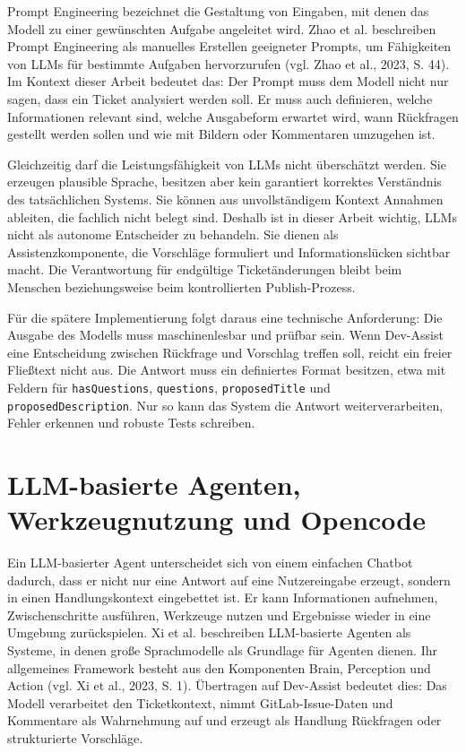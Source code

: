 \documentclass[12pt,a4paper,oneside]{scrreprt}
\begin{document}
Prompt Engineering bezeichnet die Gestaltung von Eingaben, mit denen das Modell zu einer gewünschten Aufgabe angeleitet wird. Zhao et al. beschreiben Prompt Engineering als manuelles Erstellen geeigneter Prompts, um Fähigkeiten von LLMs für bestimmte Aufgaben hervorzurufen (vgl. Zhao et al., 2023, S. 44). Im Kontext dieser Arbeit bedeutet das: Der Prompt muss dem Modell nicht nur sagen, dass ein Ticket analysiert werden soll. Er muss auch definieren, welche Informationen relevant sind, welche Ausgabeform erwartet wird, wann Rückfragen gestellt werden sollen und wie mit Bildern oder Kommentaren umzugehen ist.

Gleichzeitig darf die Leistungsfähigkeit von LLMs nicht überschätzt werden. Sie erzeugen plausible Sprache, besitzen aber kein garantiert korrektes Verständnis des tatsächlichen Systems. Sie können aus unvollständigem Kontext Annahmen ableiten, die fachlich nicht belegt sind. Deshalb ist in dieser Arbeit wichtig, LLMs nicht als autonome Entscheider zu behandeln. Sie dienen als Assistenzkomponente, die Vorschläge formuliert und Informationslücken sichtbar macht. Die Verantwortung für endgültige Ticketänderungen bleibt beim Menschen beziehungsweise beim kontrollierten Publish-Prozess.

Für die spätere Implementierung folgt daraus eine technische Anforderung: Die Ausgabe des Modells muss maschinenlesbar und prüfbar sein. Wenn Dev-Assist eine Entscheidung zwischen Rückfrage und Vorschlag treffen soll, reicht ein freier Fließtext nicht aus. Die Antwort muss ein definiertes Format besitzen, etwa mit Feldern für \texttt{hasQuestions}, \texttt{questions}, \texttt{proposedTitle} und \texttt{proposedDescription}. Nur so kann das System die Antwort weiterverarbeiten, Fehler erkennen und robuste Tests schreiben.

\section{LLM-basierte Agenten, Werkzeugnutzung und Opencode}

Ein LLM-basierter Agent unterscheidet sich von einem einfachen Chatbot dadurch, dass er nicht nur eine Antwort auf eine Nutzereingabe erzeugt, sondern in einen Handlungskontext eingebettet ist. Er kann Informationen aufnehmen, Zwischenschritte ausführen, Werkzeuge nutzen und Ergebnisse wieder in eine Umgebung zurückspielen. Xi et al. beschreiben LLM-basierte Agenten als Systeme, in denen große Sprachmodelle als Grundlage für Agenten dienen. Ihr allgemeines Framework besteht aus den Komponenten Brain, Perception und Action (vgl. Xi et al., 2023, S. 1). Übertragen auf Dev-Assist bedeutet dies: Das Modell verarbeitet den Ticketkontext, nimmt GitLab-Issue-Daten und Kommentare als Wahrnehmung auf und erzeugt als Handlung Rückfragen oder strukturierte Vorschläge.
\end{document}
